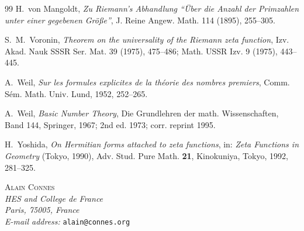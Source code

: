 \documentclass{article}
\begin{document}
\begin{thebibliography}{99}
H.~von Mangoldt, 
\emph{Zu Riemann's Abhandlung ``Über die Anzahl der Primzahlen unter einer gegebenen Größe''}, 
J. Reine Angew. Math. 114 (1895), 255--305.

S.~M.~Voronin, 
\emph{Theorem on the universality of the Riemann zeta function}, 
Izv. Akad. Nauk SSSR Ser. Mat. 39 (1975), 475--486; 
Math. USSR Izv. 9 (1975), 443--445.

A.~Weil, 
\emph{Sur les formules explicites de la théorie des nombres premiers}, 
Comm. Sém. Math. Univ. Lund, 1952, 252--265.

A.~Weil, 
\emph{Basic Number Theory}, 
Die Grundlehren der math. Wissenschaften, Band 144, Springer, 1967; 
2nd ed. 1973; corr. reprint 1995.



H.~Yoshida,  
\emph{On Hermitian forms attached to zeta functions}, 
in: \emph{Zeta Functions in Geometry} (Tokyo, 1990), Adv. Stud. Pure Math. \textbf{21}, Kinokuniya, Tokyo, 1992, 281--325.

\end{thebibliography}

\vspace{20pt}
\scriptsize
\noindent

\textsc{Alain Connes} \\ %
\textit{HES and College de France} \\
\textit{Paris, 75005, France} \\
\textit{E-mail address:} \texttt{alain@connes.org}
\end{document}
